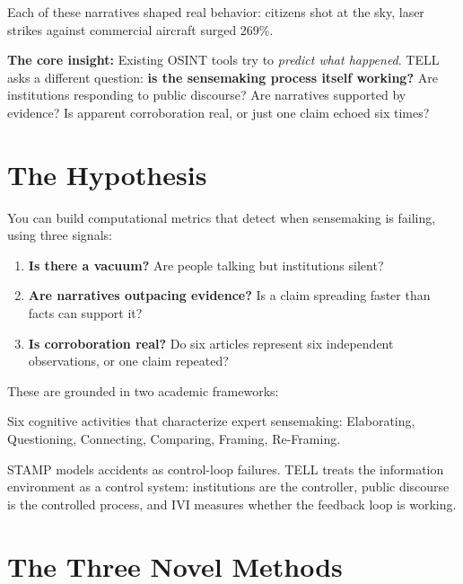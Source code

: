 \documentclass[11pt, letterpaper]{article}
\begin{document}
Each of these narratives shaped real behavior: citizens shot at the sky, laser strikes against commercial aircraft surged 269\%.

\textbf{The core insight:} Existing OSINT tools try to \emph{predict what happened}.
TELL asks a different question: \textbf{is the sensemaking process itself working?}
Are institutions responding to public discourse?
Are narratives supported by evidence?
Is apparent corroboration real, or just one claim echoed six times?


\section{The Hypothesis}

You can build computational metrics that detect when sensemaking is failing, using three signals:

\begin{enumerate}[nosep]
  \item \textbf{Is there a vacuum?} Are people talking but institutions silent?
  \item \textbf{Are narratives outpacing evidence?} Is a claim spreading faster than facts can support it?
  \item \textbf{Is corroboration real?} Do six articles represent six independent observations, or one claim repeated?
\end{enumerate}

These are grounded in two academic frameworks:

\begin{description}[style=nextline, leftmargin=1.5em]
  \item[\textnormal{Klein (2007)}] Six cognitive activities that characterize expert sensemaking: Elaborating, Questioning, Connecting, Comparing, Framing, Re-Framing.
  \item[\textnormal{Leveson (2012)}] STAMP models accidents as control-loop failures. TELL treats the information environment as a control system: institutions are the controller, public discourse is the controlled process, and IVI measures whether the feedback loop is working.
\end{description}


\section{The Three Novel Methods}
\end{document}

